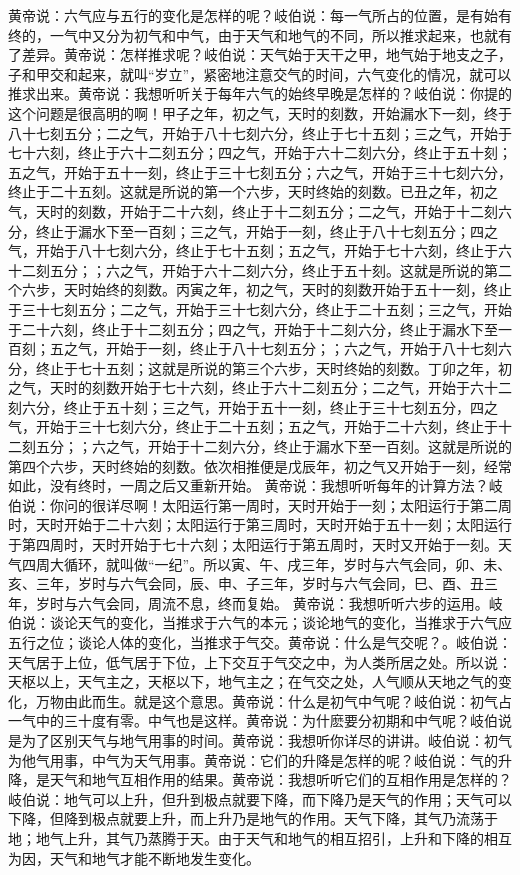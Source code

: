 \documentclass[a4paper,12pt,UTF8,twoside]{ctexbook}
\begin{document}
黄帝说：六气应与五行的变化是怎样的呢？岐伯说：每一气所占的位置，是有始有终的，一气中又分为初气和中气，由于天气和地气的不同，所以推求起来，也就有了差异。黄帝说：怎样推求呢？岐伯说：天气始于天干之甲，地气始于地支之子，子和甲交和起来，就叫“岁立”，紧密地注意交气的时间，六气变化的情况，就可以推求出来。黄帝说：我想听听关于每年六气的始终早晚是怎样的？岐伯说：你提的这个问题是很高明的啊！甲子之年，初之气，天时的刻数，开始漏水下一刻，终于八十七刻五分；二之气，开始于八十七刻六分，终止于七十五刻；三之气，开始于七十六刻，终止于六十二刻五分；四之气，开始于六十二刻六分，终止于五十刻；五之气，开始于五十一刻，终止于三十七刻五分；六之气，开始于三十七刻六分，终止于二十五刻。这就是所说的第一个六步，天时终始的刻数。已丑之年，初之气，天时的刻数，开始于二十六刻，终止于十二刻五分；二之气，开始于十二刻六分，终止于漏水下至一百刻；三之气，开始于一刻，终止于八十七刻五分；四之气，开始于八十七刻六分，终止于七十五刻；五之气，开始于七十六刻，终止于六十二刻五分；；六之气，开始于六十二刻六分，终止于五十刻。这就是所说的第二个六步，天时始终的刻数。丙寅之年，初之气，天时的刻数开始于五十一刻，终止于三十七刻五分；二之气，开始于三十七刻六分，终止于二十五刻；三之气，开始于二十六刻，终止于十二刻五分；四之气，开始于十二刻六分，终止于漏水下至一百刻；五之气，开始于一刻，终止于八十七刻五分；；六之气，开始于八十七刻六分，终止于七十五刻；这就是所说的第三个六步，天时终始的刻数。丁卯之年，初之气，天时的刻数开始于七十六刻，终止于六十二刻五分；二之气，开始于六十二刻六分，终止于五十刻；三之气，开始于五十一刻，终止于三十七刻五分，四之气，开始于三十七刻六分，终止于二十五刻；五之气，开始于二十六刻，终止于十二刻五分；；六之气，开始于十二刻六分，终止于漏水下至一百刻。这就是所说的第四个六步，天时终始的刻数。依次相推便是戊辰年，初之气又开始于一刻，经常如此，没有终时，一周之后又重新开始。
黄帝说：我想听听每年的计算方法？岐伯说：你问的很详尽啊！太阳运行第一周时，天时开始于一刻；太阳运行于第二周时，天时开始于二十六刻；太阳运行于第三周时，天时开始于五十一刻；太阳运行于第四周时，天时开始于七十六刻；太阳运行于第五周时，天时又开始于一刻。天气四周大循环，就叫做“一纪”。所以寅、午、戌三年，岁时与六气会同，卯、未、亥、三年，岁时与六气会同，辰、申、子三年，岁时与六气会同，巳、酉、丑三年，岁时与六气会同，周流不息，终而复始。
黄帝说：我想听听六步的运用。岐伯说：谈论天气的变化，当推求于六气的本元；谈论地气的变化，当推求于六气应五行之位；谈论人体的变化，当推求于气交。黄帝说：什么是气交呢？。岐伯说：天气居于上位，低气居于下位，上下交互于气交之中，为人类所居之处。所以说：天枢以上，天气主之，天枢以下，地气主之；在气交之处，人气顺从天地之气的变化，万物由此而生。就是这个意思。黄帝说：什么是初气中气呢？岐伯说：初气占一气中的三十度有零。中气也是这样。黄帝说：为什麽要分初期和中气呢？岐伯说是为了区别天气与地气用事的时间。黄帝说：我想听你详尽的讲讲。岐伯说：初气为他气用事，中气为天气用事。黄帝说：它们的升降是怎样的呢？岐伯说：气的升降，是天气和地气互相作用的结果。黄帝说：我想听听它们的互相作用是怎样的？岐伯说：地气可以上升，但升到极点就要下降，而下降乃是天气的作用；天气可以下降，但降到极点就要上升，而上升乃是地气的作用。天气下降，其气乃流荡于地；地气上升，其气乃蒸腾于天。由于天气和地气的相互招引，上升和下降的相互为因，天气和地气才能不断地发生变化。
\end{document}
